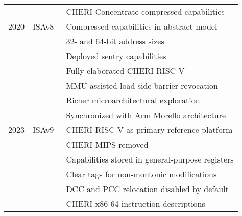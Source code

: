 \begin{tabular}{llp{3.25in}}
  & & CHERI Concentrate compressed capabilities \smallskip \\
  2020 & ISAv8~\cite{UCAM-CL-TR-951} & Compressed capabilities in abstract
  model \\
  & & 32- and 64-bit address sizes \\
  & & Deployed sentry capabilities \\
  & & Fully elaborated CHERI-RISC-V \\
  & & MMU-assisted load-side-barrier revocation \\
  & & Richer microarchitectural exploration \\
  & & Synchronized with Arm Morello architecture~\cite{arm-morello} \\
  2023 & ISAv9~\cite{UCAM-CL-TR-XXX} & CHERI-RISC-V as primary
  reference platform \\
  & & CHERI-MIPS removed \\
  & & Capabilities stored in general-purpose registers \\
  & & Clear tags for non-montonic modifications \\
  & & DCC and PCC relocation disabled by default \\
  & & CHERI-x86-64 instruction descriptions \\
\bottomrule
\end{tabular}
